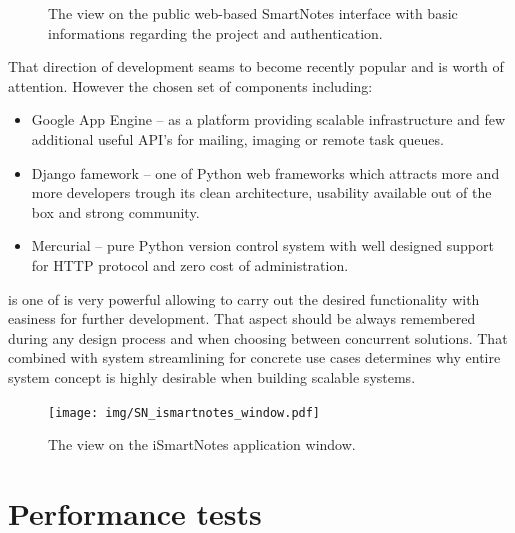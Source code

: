 \begin{figure}[ht]
\begin{center}
  \end{center}
  \caption{The view on the public web-based SmartNotes interface with basic informations regarding the project and authentication.}
  \label{fig:sn_web_interface}
\end{figure}
That direction of development seams to become recently popular and is worth of attention. However the chosen set of components including:
 \begin{itemize}
 	\item{Google App Engine -- as a platform providing scalable infrastructure and few additional useful API's for mailing, imaging or remote task queues.}
	\item{Django famework -- one of Python web frameworks which attracts more and more developers trough its clean architecture, usability available out of the box and strong community.}
	\item{Mercurial -- pure Python version control system with well designed support for HTTP protocol and zero cost of administration.}
 \end{itemize} 
 is one of is very powerful allowing to carry out the desired functionality with easiness for further development. That aspect should be always remembered during any design process and when choosing between concurrent solutions. That combined with system streamlining  for concrete use cases  determines why entire system concept is highly desirable when building scalable systems.
        
\begin{figure}[ht]
\begin{center}
\texttt{[image: img/SN\_ismartnotes\_window.pdf]}
\caption{The view on the iSmartNotes application window.}
\label{fig:ismartnotes_window}
\end{center}
\end{figure}

\section{Performance tests}\label{sec:performance} 